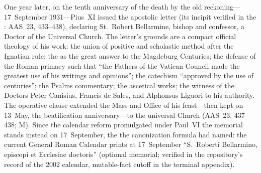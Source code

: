 One year later, on the tenth anniversary of the death by the old
reckoning---17~September 1931---Pius~XI issued the apostolic
letter  (its incipit verified in the
: AAS~23, 433--438), declaring St.~Robert Bellarmine,
bishop and confessor, a Doctor of the Universal Church. The
letter's grounds are a compact official theology of his work: the
union of positive and scholastic method after the Ignatian rule;
the  as the great answer to the Magdeburg
Centuries; the defense of the Roman primacy such that ``the
Fathers of the Vatican Council made the greatest use of his
writings and opinions''; the catechism ``approved by the use of
centuries''; the Psalms commentary; the ascetical works; the
witness of the Doctors Peter Canisius, Francis de Sales, and
Alphonsus Liguori to his authority. The operative clause extended
the Mass and Office of his feast---then kept on 13~May, the
beatification anniversary---to the universal Church (AAS~23,
437--438; M). Since the calendar reform promulgated under Paul~VI
the memorial stands instead on 17~September, the  the canonization formula had named: the current General
Roman Calendar prints at 17~September ``S.\ Roberti Bellarmino,
episcopi et Ecclesiae doctoris'' (optional memorial; verified in
the repository's record of the 2002 
calendar, mutable-fact cutoff in the terminal appendix).
